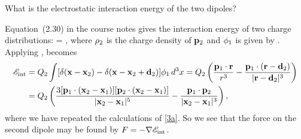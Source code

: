 \begin{problem}
	What is the electrostatic interaction energy of the two dipoles?
\end{problem}

\begin{solution}
	Equation~(2.30) in the course notes gives the interaction energy of two charge distributions:
	\beqn \label{Eint}
		\sEint = \int \rhow \phiq \dcx,
	\eeqn
	where $\rho_2$ is the charge density of $\mathbf{p}_2$ and $\phi_1$ is given by .  Applying ,  becomes
	\begin{align*}
		\mathscr{E}_\text{int} &= Q_2 \int [\delta(\mathbf{x} - \mathbf{x}_2) - \delta(\mathbf{x} - \mathbf{x}_2 + \mathbf{d}_2)] \phi_1 \dd[3]{x}
		= Q_2 \left( \frac{\mathbf{p}_1 \cdot \mathbf{r}}{r^3} - \frac{\mathbf{p}_1 \cdot (\mathbf{r} - \mathbf{d}_2)}{|\mathbf{r} - \mathbf{d}_2|^3} \right) \\
		&= Q_2 \left( \frac{3[\mathbf{p}_1 \cdot (\mathbf{x}_2 - \mathbf{x}_1)][\mathbf{p}_2 \cdot (\mathbf{x}_2 - \mathbf{x}_1)]}{|\mathbf{x}_2 - \mathbf{x}_1|^5} - \frac{\mathbf{p}_1 \cdot \mathbf{p}_2}{|\mathbf{x}_2 - \mathbf{x}_1|^3} \right),
	\end{align*}
	where we have repeated the calculations of \ref{3a}.  So we see that the force on the second dipole may be found by $F = -\nabla \mathscr{E}_\text{int}$.
\end{solution}